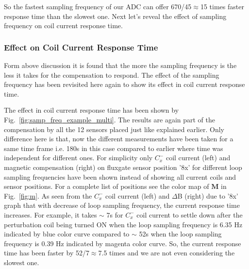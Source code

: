 So the fastest sampling frequency of our ADC can offer 670/45$\approx$15 times faster response time than the slowest one. Next let's reveal the effect of sampling frequency on coil current response time.

\FloatBarrier
\subsubsection{Effect on Coil Current Response Time }
Form above discussion it is found that the more the sampling frequency is the less it takes for the compensation to respond. The effect of the sampling frequency has been revisited here again to show its effect in coil current response time.

\FloatBarrier
{}

 The effect in coil current response time has been shown by Fig.~\ref{fig:samp_freq_example_multi}.  The results are again part of the compensation by all the 12 sensors placed just like explained earlier. Only difference here is that, now the different measurements have been taken for a same time frame i.e. 180s in this case compared to earlier where time was independent for different ones. For simplicity only $C_x^-$ coil current (left) and magnetic compensation (right) on fluxgate sensor position '8x' for different loop sampling frequencies have been shown instead of showing all current coils and sensor positions. For a complete list of positions see the color map of $\bm{M}$ in Fig.~\ref{fig:m}. As seen from the $C_x^-$ coil current (left) and $\Delta$B (right) due to '8x' graph that with decrease of loop sampling frequency, the current response time increases. For example, it takes $\sim$ 7s for $C_x^-$ coil current to settle down after the perturbation coil being turned ON when the loop sampling frequency is 6.35 Hz indicated by blue color curve compared to $\sim$ 52s when the loop sampling frequency is 0.39 Hz indicated by magenta color curve. So, the current response time has been faster by 52/7$\approx$7.5 times and we are not even considering the slowest one.

